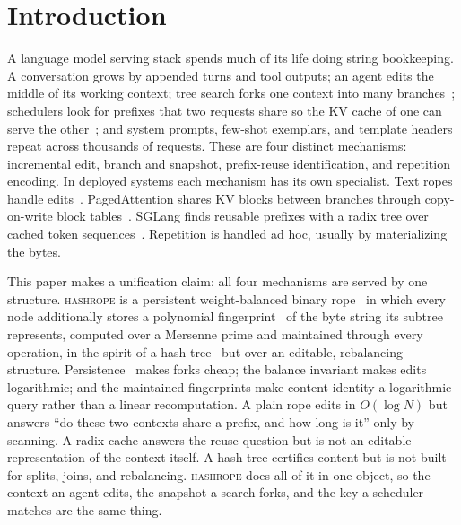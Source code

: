 \documentclass[10pt,conference]{IEEEtran}
\newcommand{\hr}{\textsc{hashrope}}
\begin{document}
\section{Introduction}\label{sec:intro}

A language model serving stack spends much of its life doing string
bookkeeping. A conversation grows by appended turns and tool outputs;
an agent edits the middle of its working context; tree search forks one
context into many branches~\cite{yao2023tot}; schedulers look for
prefixes that two requests share so the KV cache of one can serve the
other~\cite{kwon2023pagedattention,zheng2024sglang,gim2024promptcache};
and system prompts, few-shot exemplars, and template headers repeat
across thousands of requests. These are four distinct mechanisms:
incremental edit, branch and snapshot, prefix-reuse identification, and
repetition encoding. In deployed systems each mechanism has its own
specialist. Text ropes handle edits~\cite{boehm1995ropes,ropey}.
PagedAttention shares KV blocks between branches through
copy-on-write block tables~\cite{kwon2023pagedattention}. SGLang finds
reusable prefixes with a radix tree over cached token
sequences~\cite{zheng2024sglang}. Repetition is handled ad hoc, usually
by materializing the bytes.

This paper makes a unification claim: all four mechanisms are served by
one structure. \hr{} is a persistent weight-balanced binary
rope~\cite{boehm1995ropes,nievergelt1973bounded} in which every node
additionally stores a polynomial fingerprint~\cite{karp1987efficient} of
the byte string its subtree represents, computed over a Mersenne prime
and maintained through every operation, in the spirit of a hash
tree~\cite{merkle1987digital} but over an editable, rebalancing
structure. Persistence~\cite{driscoll1989persistent} makes forks cheap;
the balance invariant makes edits logarithmic; and the maintained
fingerprints make content identity a logarithmic query rather than a
linear recomputation. A plain rope edits
in $O(\log N)$ but answers ``do these two contexts share a prefix, and
how long is it'' only by scanning. A radix cache answers the reuse
question but is not an editable representation of the context itself. A
hash tree certifies content but is not built for splits, joins, and
rebalancing. \hr{} does all of it in one object, so the context an
agent edits, the snapshot a search forks, and the key a scheduler
matches are the same thing.
\end{document}
